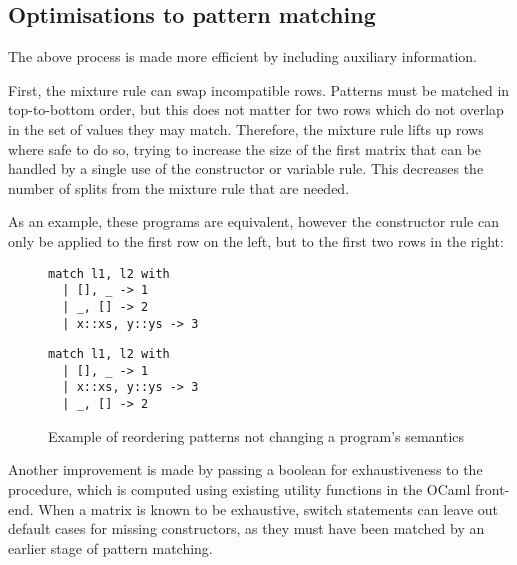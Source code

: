 

\subsection{Optimisations to pattern matching}
The above process is made more efficient by including auxiliary information. %


First, the mixture rule can swap incompatible rows. Patterns must be matched in top-to-bottom order, but this does not matter for two rows which do not overlap in the set of values they may match. Therefore, the mixture rule lifts up rows where safe to do so, trying to increase the size of the first matrix that can be handled by a single use of the constructor or variable rule. This decreases the number of splits from the mixture rule that are needed. 

As an example, these programs are equivalent, however the constructor rule can only be applied to the first row on the left, but to the first two rows in the right:

\begin{figure}[H]
\hfill
\begin{minipage}{0.45\textwidth}
\begin{verbatim}
match l1, l2 with
  | [], _ -> 1
  | _, [] -> 2
  | x::xs, y::ys -> 3
\end{verbatim}
\end{minipage}\qquad
\begin{minipage}{0.45\textwidth}
\begin{verbatim}
match l1, l2 with
  | [], _ -> 1
  | x::xs, y::ys -> 3
  | _, [] -> 2
\end{verbatim}
\end{minipage}\hfill
\caption{Example of reordering patterns not changing a program's semantics}
\end{figure}

Another improvement is made by passing a boolean for exhaustiveness to the procedure, which is computed using existing utility functions in the OCaml front-end. %
When a matrix is known to be exhaustive, switch statements can leave out default cases for missing constructors, as they must have been matched by an earlier stage of pattern matching. 



